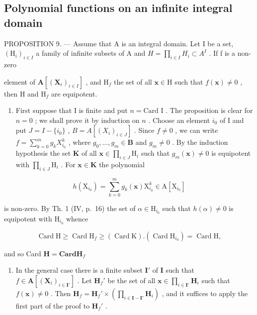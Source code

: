 \subsection{Polynomial functions on an infinite integral domain}

PROPOSITION 9. --- Assume that A is an integral domain. Let I be a set, \((\mathrm{H}_{i})_{i\in I}\) a family of infinite subsets of A and \(H=\prod_{i\in I}H_{i}\subset A^{I}\) . If f is a non-zero

element of \(\mathbf{A}[(\mathbf{X}_i)_{i\in I}]\) , and \(\mathrm{H}_f\) the set of all \(\mathbf{x}\in \mathrm{H}\) such that \(f(\mathbf{x})\neq 0\) , then \(\mathrm{H}\) and \(\mathrm{H}_f\) are equipotent.

\begin{enumerate}
\def\labelenumi{\alph{enumi})}
\tightlist
\item
  First suppose that I is finite and put \(n = \text{Card I}\) . The proposition is clear for \(n = 0\) ; we shall prove it by induction on \(n\) . Choose an element \(i_0\) of I and put \(J = I - \{i_0\}\) , \(B = A[(X_i)_{i \in J}]\) . Since \(f \neq 0\) , we can write \(f = \sum_{k=0}^{m} g_k X_{i_0}^k\) , where \(g_0, \ldots, g_m \in \mathbf{B}\) and \(g_m \neq 0\) . By the induction hypothesis the set \(\mathbf{K}\) of all \(\mathbf{x} \in \prod_{i \in J} \mathrm{H}_i\) such that \(g_m(\mathbf{x}) \neq 0\) is equipotent with \(\prod_{i \in J} \mathrm{H}_i\) . For \(\mathbf{x} \in \mathbf{K}\) the polynomial
\end{enumerate}

\[
h \left(\mathrm{X} _ {i _ {0}}\right) = \sum_ {k = 0} ^ {m} g _ {k} (\mathbf {x}) \mathrm{X} _ {i _ {0}} ^ {k} \in \mathrm{A} \left[ \mathrm{X} _ {i _ {0}} \right]
\]

is non-zero. By Th. 1 (IV, p.~16) the set of \(\alpha \in \mathrm{H}_{i_0}\) such that \(h(\alpha) \neq 0\) is equipotent with \(\mathrm{H}_{i_0}\) whence

\[
\operatorname{Card} \mathrm{H} \geqslant \operatorname{Card} \mathrm{H} _ {f} \geqslant (\operatorname{Card} \mathrm{K}). (\operatorname{Card} \mathrm{H} _ {i _ {0}}) = \operatorname{Card} \mathrm{H},
\]

and so Card \(\mathbf{H} = \mathbf{Card}\mathbf{H}_f\)

\begin{enumerate}
\def\labelenumi{\alph{enumi})}
\setcounter{enumi}{1}
\tightlist
\item
  In the general case there is a finite subset \(\mathbf{I}'\) of \(\mathbf{I}\) such that \(f \in \mathbf{A}[(\mathbf{X}_i)_{i \in \mathbf{I}'}]\) . Let \(\mathbf{H}_f'\) be the set of all \(\mathbf{x} \in \prod_{i \in \mathbf{I}'} \mathbf{H}_i\) such that \(f(\mathbf{x}) \neq 0\) . Then \(\mathbf{H}_f = \mathbf{H}_f' \times \left( \prod_{i \in \mathbf{I} - \mathbf{I}'} \mathbf{H}_i \right)\) , and it suffices to apply the first part of the proof to \(\mathbf{H}_f'\) .
\end{enumerate}

